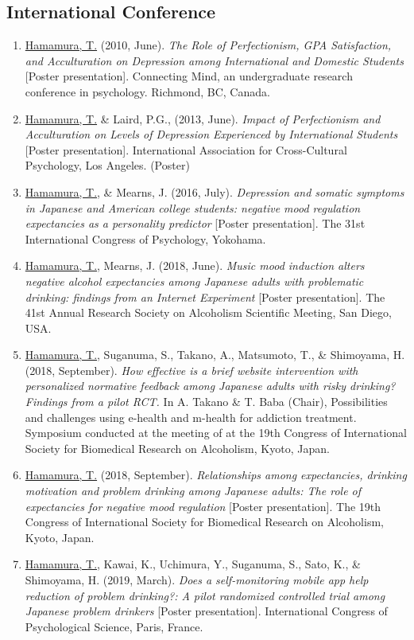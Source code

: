 \documentclass[a4paper]{article}
\begin{document}
\subsection{International Conference}
\begin{enumerate}
	\item \underline{Hamamura, T.} (2010, June). \textit{The Role of Perfectionism, GPA Satisfaction, and Acculturation on Depression among International and Domestic Students} [Poster presentation]. Connecting Mind, an undergraduate research conference in psychology. Richmond, BC, Canada.
	\item \underline{Hamamura, T.} \& Laird, P.G., (2013, June). \textit{Impact of Perfectionism and Acculturation on Levels of Depression Experienced by International Students} [Poster presentation]. International Association for Cross-Cultural Psychology, Los Angeles. (Poster)
	\item \underline{Hamamura, T.}, \& Mearns, J. (2016, July). \textit{Depression and somatic symptoms in Japanese and American college students: negative mood regulation expectancies as a personality predictor} [Poster presentation]. The 31st International Congress of Psychology, Yokohama.
	\item \underline{Hamamura, T.}, Mearns, J. (2018, June). \textit{Music mood induction alters negative alcohol expectancies among Japanese adults with problematic drinking: findings from an Internet Experiment} [Poster presentation]. The 41st Annual Research Society on Alcoholism Scientific Meeting, San Diego, USA.
	\item \underline{Hamamura, T.}, Suganuma, S., Takano, A., Matsumoto, T., \& Shimoyama, H. (2018, September). \textit{How effective is a brief website intervention with personalized normative feedback among Japanese adults with risky drinking? Findings from a pilot RCT.} In A. Takano \& T. Baba (Chair), Possibilities and challenges using e-health and m-health for addiction treatment. Symposium conducted at the meeting of at the 19th Congress of International Society for Biomedical Research on Alcoholism, Kyoto, Japan.
	\item \underline{Hamamura, T.} (2018, September). \textit{Relationships among expectancies, drinking motivation and problem drinking among Japanese adults: The role of expectancies for negative mood regulation} [Poster presentation]. The 19th Congress of International Society for Biomedical Research on Alcoholism, Kyoto, Japan.
	\item \underline{Hamamura, T.}, Kawai, K., Uchimura, Y., Suganuma, S., Sato, K., \& Shimoyama, H. (2019, March). \textit{Does a self-monitoring mobile app help reduction of problem drinking?: A pilot randomized controlled trial among Japanese problem drinkers} [Poster presentation]. International Congress of Psychological Science, Paris, France.

\end{enumerate}
\end{document}
